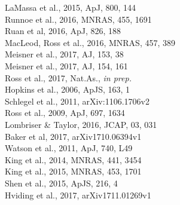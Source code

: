 \documentclass[oneside, a4paper, onecolumn, 11pt]{article}
\begin{document}
\begin{multicols}{2}[]
\rbrack LaMassa et al., 2015, ApJ, 800, 144\\
\rbrack Runnoe et al., 2016, MNRAS, 455, 1691\\
\rbrack Ruan et al, 2016, ApJ, 826, 188\\
\rbrack MacLeod, Ross et al., 2016, MNRAS, 457, 389\\
\rbrack Meisner et al., 2017, AJ, 153, 38 \\
\rbrack Meisner et al., 2017, AJ, 154, 161 \\
\rbrack Ross et al., 2017, Nat.As., {\it in prep.} \\
\rbrack Hopkins et al., 2006, ApJS, 163, 1\\
\rbrack Schlegel et al., 2011,  arXiv:1106.1706v2 \\
%
\rbrack Ross et al., 2009, ApJ, 697, 1634 \\
\rbrack Lombriser \& Taylor, 2016, JCAP, 03, 031 \\
\rbrack Baker et al, 2017,  arXiv1710.06394v1 \\
\rbrack Watson et al.,  2011, ApJ, 740, L49\\
\rbrack King et al., 2014, MNRAS, 441, 3454\\
\rbrack King et al., 2015, MNRAS, 453, 1701\\
\rbrack Shen et al., 2015, ApJS, 216, 4\\
\rbrack Hviding et al.,  2017, arXiv1711.01269v1 



\end{multicols}
\end{document}
